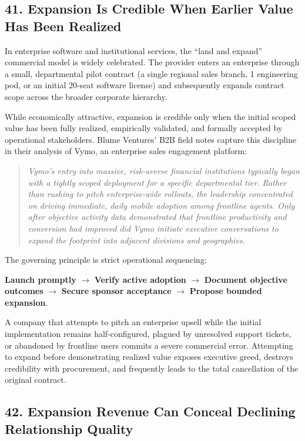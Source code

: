 \subsection*{41. Expansion Is Credible When Earlier Value Has Been Realized}

In enterprise software and institutional services, the ``land and expand'' commercial model is widely celebrated. The provider enters an enterprise through a small, departmental pilot contract (a single regional sales branch, 1 engineering pod, or an initial 20-seat software license) and subsequently expands contract scope across the broader corporate hierarchy.

While economically attractive, expansion is credible only when the initial scoped value has been fully realized, empirically validated, and formally accepted by operational stakeholders. Blume Ventures' B2B field notes capture this discipline in their analysis of Vymo, an enterprise sales engagement platform:
\begin{quote}
\textit{Vymo's entry into massive, risk-averse financial institutions typically began with a tightly scoped deployment for a specific departmental tier. Rather than rushing to pitch enterprise-wide rollouts, the leadership concentrated on driving immediate, daily mobile adoption among frontline agents. Only after objective activity data demonstrated that frontline productivity and conversion had improved did Vymo initiate executive conversations to expand the footprint into adjacent divisions and geographies.}
\end{quote}
The governing principle is strict operational sequencing:
\begin{center}
\textbf{Launch promptly} $\longrightarrow$ \textbf{Verify active adoption} $\longrightarrow$ \textbf{Document objective outcomes} $\longrightarrow$ \textbf{Secure sponsor acceptance} $\longrightarrow$ \textbf{Propose bounded expansion}.
\end{center}

A company that attempts to pitch an enterprise upsell while the initial implementation remains half-configured, plagued by unresolved support tickets, or abandoned by frontline users commits a severe commercial error. Attempting to expand before demonstrating realized value exposes executive greed, destroys credibility with procurement, and frequently leads to the total cancellation of the original contract.

\subsection*{42. Expansion Revenue Can Conceal Declining Relationship Quality}

